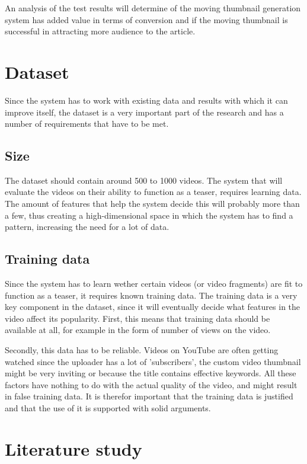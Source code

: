 \documentclass{../resources/acm_proc_article-sp}
\begin{document}
An analysis of the test results will determine of the moving thumbnail generation system has added value in terms of conversion and if the moving thumbnail is successful in attracting more audience to the article.

\section{Dataset}

Since the system has to work with existing data and results with which it can improve itself, the dataset is a very important part of the research and has a number of requirements that have to be met.

\subsection{Size}

The dataset should contain around 500 to 1000 videos. The system that will evaluate the videos on their ability to function as a teaser, requires learning data. The amount of features that help the system decide this will probably more than a few, thus creating a high-dimensional space in which the system has to find a pattern, increasing the need for a lot of data.

\subsection{Training data}

Since the system has to learn wether certain videos (or video fragments) are fit to function as a teaser, it requires known training data. The training data is a very key component in the dataset, since it will eventually decide what features in the video affect its popularity. First, this means that training data should be available at all, for example in the form of number of views on the video.

Secondly, this data has to be reliable. Videos on YouTube are often getting watched since the uploader has a lot of 'subscribers', the custom video thumbnail might be very inviting or because the title contains effective keywords. All these factors have nothing to do with the actual quality of the video, and might result in false training data. It is therefor important that the training data is justified and that the use of it is supported with solid arguments.

\section{Literature study}
\end{document}
